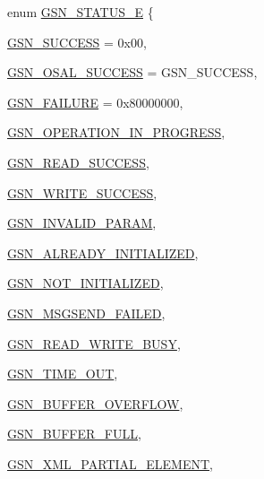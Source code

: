\begin{DoxyCompactItemize}
\item 
enum \hyperlink{a00659_ga476ae1caf992f8287176b2cc414c8707}{GSN\_\-STATUS\_\-E} \{ \par
\hyperlink{a00659_gga476ae1caf992f8287176b2cc414c8707aa518ede9f4651bd315723e868d18f1e2}{GSN\_\-SUCCESS} =  0x00, 
\par
\hyperlink{a00659_gga476ae1caf992f8287176b2cc414c8707a7110267b17c4bb48d3308f4a993e95a4}{GSN\_\-OSAL\_\-SUCCESS} =  GSN\_\-SUCCESS, 
\par
\hyperlink{a00659_gga476ae1caf992f8287176b2cc414c8707a61f45bbd1257398ddf7091b017d43f88}{GSN\_\-FAILURE} =  0x80000000, 
\par
\hyperlink{a00659_gga476ae1caf992f8287176b2cc414c8707adaba31fb7820d714c2f8cb66ed6d5bcf}{GSN\_\-OPERATION\_\-IN\_\-PROGRESS}, 
\par
\hyperlink{a00659_gga476ae1caf992f8287176b2cc414c8707a86a353d31341ffaea1673dcd88573bad}{GSN\_\-READ\_\-SUCCESS}, 
\par
\hyperlink{a00659_gga476ae1caf992f8287176b2cc414c8707a99d3442f05ae3d0d5c76484f3bd4c3eb}{GSN\_\-WRITE\_\-SUCCESS}, 
\par
\hyperlink{a00659_gga476ae1caf992f8287176b2cc414c8707a9afd53c81a711623ea31bb9f25471dfa}{GSN\_\-INVALID\_\-PARAM}, 
\par
\hyperlink{a00659_gga476ae1caf992f8287176b2cc414c8707a33bdc119848b9830b26add61fed7a377}{GSN\_\-ALREADY\_\-INITIALIZED}, 
\par
\hyperlink{a00659_gga476ae1caf992f8287176b2cc414c8707ad2cf00de07c6a4961d4f5d6c333ea5a0}{GSN\_\-NOT\_\-INITIALIZED}, 
\par
\hyperlink{a00659_gga476ae1caf992f8287176b2cc414c8707a9b5f488607db28aa9b06e4f085e99b27}{GSN\_\-MSGSEND\_\-FAILED}, 
\par
\hyperlink{a00659_gga476ae1caf992f8287176b2cc414c8707a10812f5beec9c2c2c0e316439f3395d3}{GSN\_\-READ\_\-WRITE\_\-BUSY}, 
\par
\hyperlink{a00659_gga476ae1caf992f8287176b2cc414c8707adebd73fde19b042cd871ac4c7ec49028}{GSN\_\-TIME\_\-OUT}, 
\par
\hyperlink{a00659_gga476ae1caf992f8287176b2cc414c8707ad1d314b954e6cfaf6db84ea20660bbb7}{GSN\_\-BUFFER\_\-OVERFLOW}, 
\par
\hyperlink{a00659_gga476ae1caf992f8287176b2cc414c8707a7c75a1442d986e545085ed00ad16af0e}{GSN\_\-BUFFER\_\-FULL}, 
\par
\hyperlink{a00659_gga476ae1caf992f8287176b2cc414c8707a01ca11b8e39bf12989020ac800aeed79}{GSN\_\-XML\_\-PARTIAL\_\-ELEMENT}, 

\end{DoxyCompactItemize}
